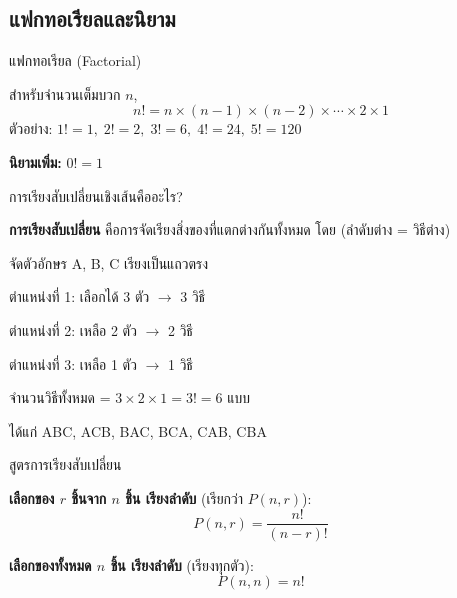 \documentclass[11pt, aspectratio=169]{beamer}
\begin{document}
\subsection{แฟกทอเรียลและนิยาม}

\begin{frame}{แฟกทอเรียล (Factorial)}
  \begin{explanation}
    สำหรับจำนวนเต็มบวก $n$,
    \[
      n! = n \times (n-1) \times (n-2) \times \cdots \times 2 \times 1
    \]
    ตัวอย่าง: $1! = 1, \;  2! = 2, \;  3! = 6, \;  4! = 24, \;  5! = 120$

    \medskip
    \textbf{นิยามเพิ่ม:} $0! = 1$
  \end{explanation}
\end{frame}

\begin{frame}{การเรียงสับเปลี่ยนเชิงเส้นคืออะไร?}
  \begin{explanation}
    \textbf{การเรียงสับเปลี่ยน} คือการจัดเรียงสิ่งของที่แตกต่างกันทั้งหมด
    โดย  (ลำดับต่าง = วิธีต่าง)
  \end{explanation}

  \begin{exambox}[ตัวอย่าง]
    จัดตัวอักษร A, B, C เรียงเป็นแถวตรง

    \medskip
    ตำแหน่งที่ 1: เลือกได้ 3 ตัว \quad $\rightarrow$ 3 วิธี

    ตำแหน่งที่ 2: เหลือ 2 ตัว \quad $\rightarrow$ 2 วิธี

    ตำแหน่งที่ 3: เหลือ 1 ตัว \quad $\rightarrow$ 1 วิธี

    \medskip
    จำนวนวิธีทั้งหมด = $3 \times 2 \times 1 = 3! = 6$ แบบ

    \medskip
    ได้แก่ ABC, ACB, BAC, BCA, CAB, CBA
  \end{exambox}
\end{frame}

\begin{frame}{สูตรการเรียงสับเปลี่ยน}
  \begin{explanation}[สูตร]
    \textbf{เลือกของ $r$ ชิ้นจาก $n$ ชิ้น เรียงลำดับ} (เรียกว่า $P(n, r)$):
    \[
      P(n, r) = \frac{n!}{(n-r)!}
    \]

    \medskip
    \textbf{เลือกของทั้งหมด $n$ ชิ้น เรียงลำดับ} (เรียงทุกตัว):
    \[
      P(n, n) = n!
    \]
  \end{explanation}
\end{frame}
\end{document}
